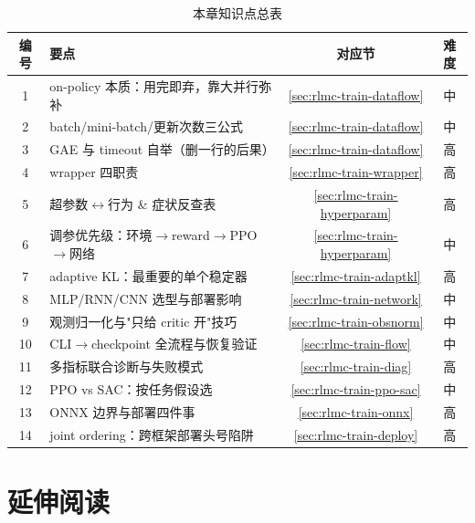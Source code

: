 \begin{table}[H]
\centering
\caption{本章知识点总表}
\label{tab:rlmc-train-knowledge}
\begin{tabular}{clcc}
\hline
编号 & 要点 & 对应节 & 难度 \\
\hline
1 & on-policy 本质：用完即弃，靠大并行弥补 & \cref{sec:rlmc-train-dataflow} & 中 \\
2 & batch/mini-batch/更新次数三公式 & \cref{sec:rlmc-train-dataflow} & 中 \\
3 & GAE 与 timeout 自举（删一行的后果） & \cref{sec:rlmc-train-dataflow} & 高 \\
4 & wrapper 四职责 & \cref{sec:rlmc-train-wrapper} & 高 \\
5 & 超参数$\leftrightarrow$行为 \& 症状反查表 & \cref{sec:rlmc-train-hyperparam} & 高 \\
6 & 调参优先级：环境$\to$reward$\to$PPO$\to$网络 & \cref{sec:rlmc-train-hyperparam} & 中 \\
7 & adaptive KL：最重要的单个稳定器 & \cref{sec:rlmc-train-adaptkl} & 高 \\
8 & MLP/RNN/CNN 选型与部署影响 & \cref{sec:rlmc-train-network} & 中 \\
9 & 观测归一化与"只给 critic 开"技巧 & \cref{sec:rlmc-train-obsnorm} & 中 \\
10 & CLI$\to$checkpoint 全流程与恢复验证 & \cref{sec:rlmc-train-flow} & 中 \\
11 & 多指标联合诊断与失败模式 & \cref{sec:rlmc-train-diag} & 高 \\
12 & PPO vs SAC：按任务假设选 & \cref{sec:rlmc-train-ppo-sac} & 中 \\
13 & ONNX 边界与部署四件事 & \cref{sec:rlmc-train-onnx} & 高 \\
14 & joint ordering：跨框架部署头号陷阱 & \cref{sec:rlmc-train-deploy} & 高 \\
\hline
\end{tabular}
\end{table}

\section*{延伸阅读}
\label{sec:rlmc-train-further}

